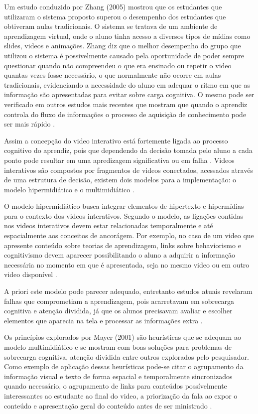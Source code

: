 Um estudo conduzido por Zhang (2005) mostrou que os estudantes que utilizaram o sistema proposto superou o desempenho dos estudantes que obtiveram aulas tradicionais. O sistema se tratava de um ambiente de aprendizagem virtual, onde o aluno tinha acesso a diversos tipos de mídias como slides, videos e animações. Zhang diz que o melhor desempenho do grupo que utilizou o sistema é possivelmente causado pela oportunidade de poder sempre questionar quando não compreendeu o que era ensinado ou repetir o video quantas vezes fosse necessário, o que normalmente não ocorre em aulas tradicionais, evidenciando a necessidade do aluno em adequar o ritmo em que as informação são apresentadas para evitar sobre carga cognitiva. O mesmo pode ser verificado em outros estudos mais recentes que mostram que quando o aprendiz controla do fluxo de informações o processo de aquisição de conhecimento pode ser mais rápido \cite{schwan2004, mayer2001}.

Assim a concepção do video interativo está fortemente ligada ao processo cognitivo do aprendiz, pois que dependendo da decisão tomada pelo aluno a cada ponto pode resultar em uma apredizagem significativa ou em falha \cite{moreno2000}. Videos interativos são compostos por fragmentos de videos conectados, acessados através de uma estrutura de decisão, existem dois modelos para a implementação: o modelo hipermidiático e o multimidiático \cite{wetzel1994}.

O modelo hipermidiático busca integrar elementos de hipertexto e hipermídias para o contexto dos videos interativos. Segundo o modelo, as ligações contidas nos videos interativos devem estar relacionadas temporalmente e até espacialmente aos conceitos de ancorágem. Por exemplo, no caso de um video que apresente conteúdo sobre teorias de aprendizagem, links sobre behaviorismo e cognitivismo devem aparecer possibilitando o aluno a adquirir a informação necessária no momento em que é apresentada, seja no mesmo video ou em outro video disponível \cite{wetzel1994}.

A priori este modelo pode parecer adequado, entretanto estudos atuais revelaram falhas que comprometiam a aprendizagem, pois acarretavam em sobrecarga cognitiva e atenção dividida, já que os alunos precisavam avaliar e escolher elementos que aparecia na tela e processar as informações extra \cite{zhang2005, moreno2000}.

Os princípios explorados por Mayer (2001) são heurísticas que se adequam ao modelo multimidiático e se mostram com boas soluções para problemas de sobrecarga cognitiva, atenção dividida entre outros explorados pelo pesquisador. Como exemplo de aplicação dessas heurísticas pode-se citar o agrupamento da informação visual e texto de forma espacial e temporalmente sincronizados quando necessário, o agrupamento de links para conteúdos possívelmente interessantes ao estudante ao final do video, a priorização da fala ao expor o conteúdo e apresentação geral do conteúdo antes de ser ministrado \cite{mayer2001}.

